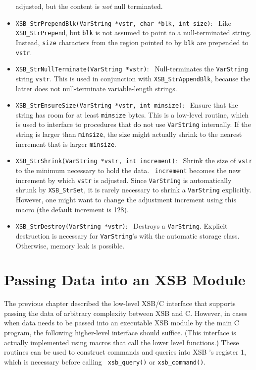 \begin{itemize}
    adjusted, but the content is \emph{not} null terminated.
  \item {\tt XSB\_StrPrependBlk(VarString *vstr, char *blk, int size)}:~
    Like {\tt XSB\_StrPrepend}, but {\tt blk} is not assumed to point to a
    null-terminated string. Instead, {\tt size} characters from the region
    pointed to by {\tt blk} are prepended to {\tt vstr}.
  \item {\tt XSB\_StrNullTerminate(VarString *vstr)}:~
    Null-terminates the {\tt VarString}  string {\tt vstr}. This is used in
    conjunction with {\tt XSB\_StrAppendBlk}, because the latter does not
    null-terminate variable-length strings.
  \item {\tt XSB\_StrEnsureSize(VarString *vstr, int minsize)}:~
    Ensure that the string has room for at least {\tt minsize} bytes.
    This is a low-level routine, which is used to interface to procedures
    that do not use {\tt VarString} internally. If the string is larger
    than {\tt minsize}, the size might actually shrink to the nearest
    increment that is larger {\tt minsize}.
  \item {\tt XSB\_StrShrink(VarString *vstr, int increment)}:~ Shrink the
    size of {\tt vstr} to the minimum necessary to hold the data. {\tt
      increment} becomes the new increment by which {\tt vstr} is adjusted.
    Since {\tt VarString} is automatically shrunk by {\tt XSB\_StrSet}, it
    is rarely necessary to shrink a {\tt VarString} explicitly.  However,
    one might want to change the adjustment increment using this macro (the
    default increment is 128).
  \item {\tt XSB\_StrDestroy(VarString *vstr)}:~
    Destroys a {\tt VarString}.  Explicit destruction is necessary for
    {\tt VarString}'s with the automatic storage class. Otherwise, memory
    leak is possible.
\end{itemize}


\section{Passing Data into an XSB Module}

The previous chapter described the low-level XSB/C interface that supports
passing the data of arbitrary complexity between XSB and C. However, in
cases when data needs to be passed into an executable XSB module by the
main C program, the following higher-level interface should suffice.  (This
interface is actually implemented using macros that call the lower level
functions.)  These routines can be used to construct commands and queries
into XSB 's register 1, which is necessary before calling {\tt
  xsb\_query()} or {\tt xsb\_command()}.


